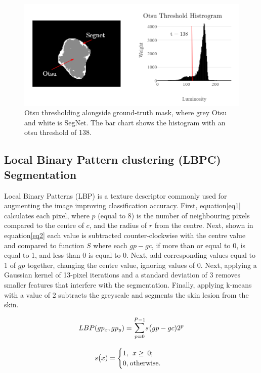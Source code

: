 \begin{figure}
\centering
\includegraphics[scale=0.7]{images/otsu3.png}
\caption{Otsu thresholding alongside ground-truth mask, where grey Otsu and white is SegNet. The bar chart shows the histogram with an otsu threshold of 138.}\label{otsu2}
\end{figure}

\subsection{Local Binary Pattern clustering (LBPC) Segmentation}
Local Binary Patterns (LBP) is a texture descriptor commonly used for augmenting the image improving classification accuracy\cite{Pereira2020, Kaya2016}. First, equation\ref{eq1} calculates each pixel, where $p$ (equal to 8) is the number of neighbouring pixels compared to the centre of $c$, and the radius of $r$ from the centre. Next, shown in equation\ref{eq2} each value is subtracted counter-clockwise with the centre value and compared to function $S$ where each $gp - gc$, if more than or equal to 0, is equal to 1, and less than 0 is equal to 0. Next, add corresponding values equal to 1 of $gp$ together, changing the centre value, ignoring values of 0. Next, applying a Gaussian kernel of 13-pixel iterations and a standard deviation of 3 removes smaller features that interfere with the segmentation. Finally, applying k-means with a value of 2 subtracts the greyscale and segments the skin lesion from the skin.

\begin{equation} \label{eq1}
LBP(gp_x, gp_y) = \mathlarger{\sum}_{p=0}^{P-1}s\big(gp - gc)2^p
\end{equation}

\begin{equation} \label{eq2}
s\big(x) = 
\begin{cases}
1,\:\:x\geq\:0; \\
0,\:$otherwise$.
\end{cases}
\end{equation}

